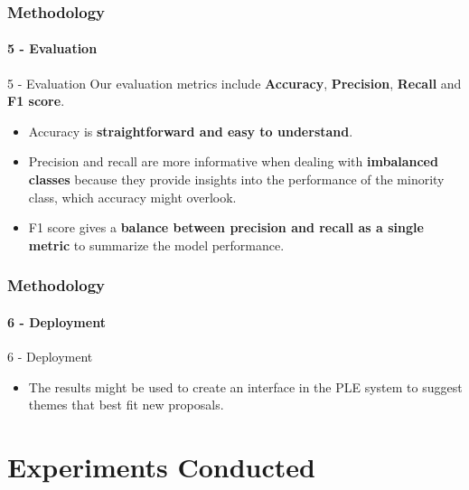 \begin{frame}
	\frametitle{Methodology}
	\framesubtitle{5 - Evaluation}	
	
	\begin{block}{5 - Evaluation} 
			Our evaluation metrics include \textbf{Accuracy}, \textbf{Precision}, \textbf{Recall} and \textbf{F1 score}.
	\end{block}

	\begin{block}{} 
		\begin{itemize}
			\item Accuracy is \textbf{straightforward and easy to understand}.
			\item Precision and recall are more informative when dealing with \textbf{imbalanced classes} because they provide insights into the performance of the minority class, which accuracy might overlook.
			
			\item F1 score gives a \textbf{balance between precision and recall as a single metric} to summarize the model performance.
		\end{itemize}
	\end{block}
\end{frame}
\begin{frame}
	\frametitle{Methodology}
	\framesubtitle{6 - Deployment}	
	
	\begin{block}{6 - Deployment} 
		\begin{itemize}
			\item The results might be used to create an interface in the PLE system to suggest themes that best fit new proposals.
		\end{itemize}
	\end{block}
\end{frame}
\section{Experiments Conducted}



